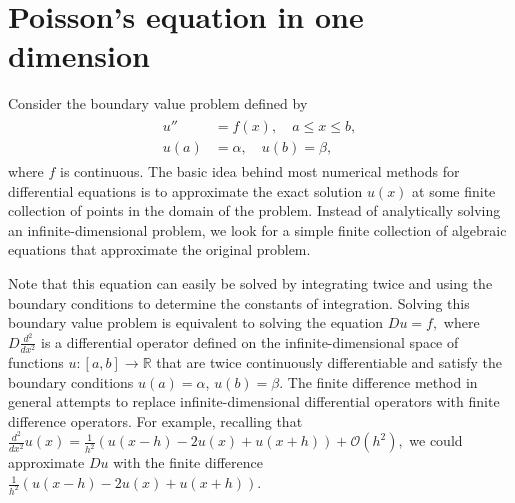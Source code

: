 \section{Poisson's equation in one dimension}
Consider the boundary value problem defined by
\begin{align}
	\begin{split}
u'' &= f(x), \quad a \leq x \leq b,\\
	u(a) &= \alpha,\quad u(b) = \beta,
	\end{split}
\end{align}
where $f$ is continuous. 
The basic idea behind most numerical methods for differential equations is to 
approximate the exact solution $u(x)$ at some finite collection of points in the 
domain of the problem. Instead of analytically solving an infinite-dimensional
problem, we look for a simple finite collection of algebraic equations that approximate the original problem.

Note that this equation can easily be solved by integrating twice 
and using the boundary conditions to determine the constants of integration. 
Solving this boundary
value problem is equivalent to solving the equation $Du = f,$
where $D\frac{d^2}{dx^2}$ is a differential operator defined on the infinite-dimensional space 
of functions $u:[a,b] \to \mathbb{R}$ that are twice continuously differentiable and 
satisfy the boundary conditions $u(a) = \alpha$, $u(b) = \beta$. The finite difference method in general attempts to replace infinite-dimensional differential operators with finite difference operators. For example, recalling that $\frac{d^2}{dx^2}u(x) = \frac{1}{h^2}\left(u(x-h) -2u(x) + u(x+h)\right) + \mathcal{O}(h^2),$ we could  approximate $Du$ with the finite difference $\frac{1}{h^2}\left(u(x-h) -2u(x) + u(x+h)\right).$


